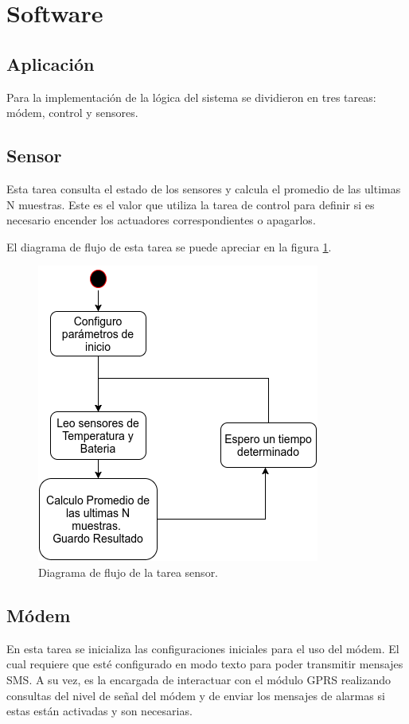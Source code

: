 \section{Software}
\subsection{Aplicación}
Para la implementación de la lógica del sistema se dividieron en tres tareas: módem, control y sensores. 

\subsection*{Sensor}

Esta tarea consulta el estado de los sensores y calcula el promedio de las ultimas N muestras. Este es el valor que utiliza la tarea de control para definir si es necesario encender los actuadores correspondientes o apagarlos.

El diagrama de flujo de esta tarea se puede apreciar en la figura \ref{fig:sensor_task}.

\begin{figure}[!htp]
  \centering
  \includegraphics[scale=.7]{./Figures/sensor_task.png}
  \caption{Diagrama de flujo de la tarea sensor.}
  \label{fig:sensor_task}
\end{figure}


\subsection*{Módem}
  En esta tarea se inicializa las configuraciones iniciales para el uso del módem. El cual requiere que esté configurado en modo texto para poder transmitir mensajes SMS. A su vez, es la encargada de interactuar con el módulo GPRS realizando consultas del nivel de señal del módem y de enviar los mensajes de alarmas si estas están activadas y son necesarias.

